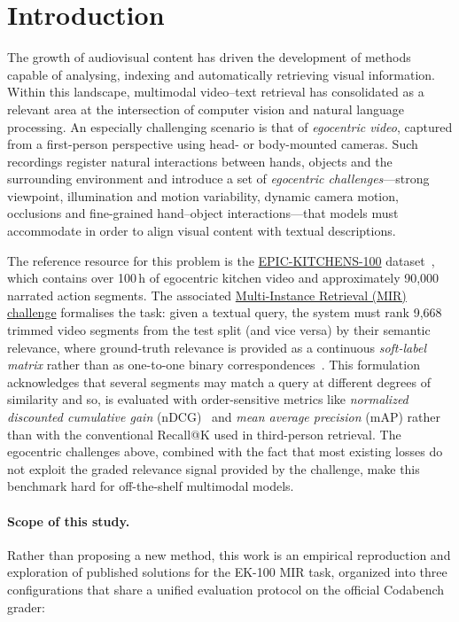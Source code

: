 \section{Introduction}
\label{sec:intro}

The growth of audiovisual content has driven the development of methods capable of analysing, indexing and automatically retrieving visual information. Within this landscape, multimodal video--text retrieval has consolidated as a relevant area at the intersection of computer vision and natural language processing. An especially challenging scenario is that of \emph{egocentric video}, captured from a first-person perspective using head- or body-mounted cameras. Such recordings register natural interactions between hands, objects and the surrounding environment and introduce a set of \emph{egocentric challenges}---strong viewpoint, illumination and motion variability, dynamic camera motion, occlusions and fine-grained hand--object interactions---that models must accommodate in order to align visual content with textual descriptions.

The reference resource for this problem is the \href{https://epic-kitchens.github.io/}{EPIC-KITCHENS-100} dataset~\cite{damen2022rescaling}, which contains over 100\,h of egocentric kitchen video and approximately 90{,}000 narrated action segments. The associated \href{https://www.codabench.org/competitions/12008/\#/pages-tab}{Multi-Instance Retrieval (MIR) challenge} formalises the task: given a textual query, the system must rank 9{,}668 trimmed video segments from the test split (and vice versa) by their semantic relevance, where ground-truth relevance is provided as a continuous \emph{soft-label matrix} rather than as one-to-one binary correspondences~\cite{damen2022rescaling,wray2021semantic}. This formulation acknowledges that several segments may match a query at different degrees of similarity and so, is evaluated with order-sensitive metrics like \emph{normalized discounted cumulative gain} (nDCG)~\cite{jarvelin2002ndcg} and \emph{mean average precision} (mAP) rather than with the conventional Recall@K used in third-person retrieval. The egocentric challenges above, combined with the fact that most existing losses do not exploit the graded relevance signal provided by the challenge, make this benchmark hard for off-the-shelf multimodal models.

\paragraph{Scope of this study.}
Rather than proposing a new method, this work is an empirical reproduction and exploration of published solutions for the EK-100 MIR task, organized into three configurations that share a unified evaluation protocol on the official Codabench grader:

